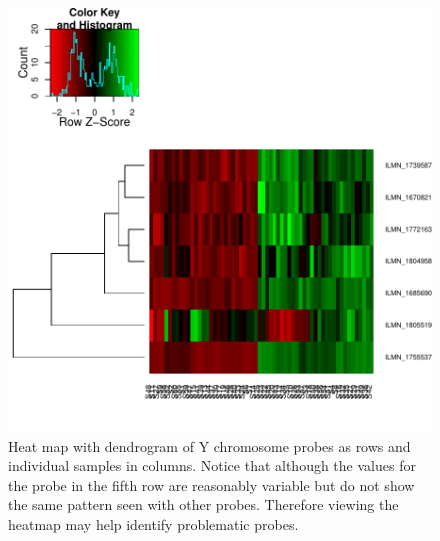 \documentclass{article}
\begin{document}
\begin{figure}
\begin{center}
\includegraphics{massiR_Vignette-fig2}
\end{center}
\caption{Heat map with dendrogram of Y chromosome probes as rows and individual samples in columns. Notice that although the values for the probe in the fifth row are reasonably variable but do not show the same pattern seen with other probes. Therefore viewing the heatmap may help identify problematic probes.}
\label{fig:fig2}
\end{figure}
\end{document}
